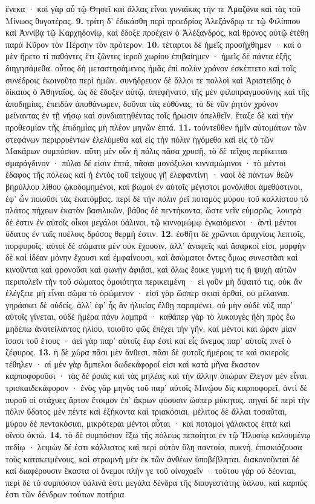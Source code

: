 \documentclass[a4paper, 11pt, oneside, polutonikogreek, german]{article}
\begin{document}
ἕνεκα · καὶ γὰρ αὖ τῷ Θησεῖ καὶ ἄλλας εἶναι γυναῖκας τήν τε Ἀμαζόνα καὶ τὰς τοῦ Μίνωος θυγατέρας. \textbf{9.} τρίτη δ' ἐδικάσθη περὶ προεδρίας Ἀλεξάνδρῳ τε τῷ Φιλίππου καὶ Ἀννίβᾳ τῷ Καρχηδονίῳ, καὶ ἔδοξε προέχειν ὁ Ἀλέξανδρος, καὶ θρόνος αὐτῷ ἐτέθη παρὰ Κῦρον τὸν Πέρσην τὸν πρότερον. \textbf{10.} τέταρτοι δὲ ἡμεῖς προσήχθημεν · καὶ ὁ μὲν ἤρετο τί παθόντες ἔτι ζῶντες ἱεροῦ χωρίου ἐπιβαίημεν · ἡμεῖς δὲ πάντα ἑξῆς διηγησάμεθα. οὗτος δὴ μεταστησάμενος ἡμᾶς ἐπὶ πολὺν χρόνον ἐσκέπτετο καὶ τοῖς συνέδροις ἐκοινοῦτο περὶ ἡμῶν. συνήδρευον δὲ ἄλλοι τε πολλοὶ καὶ Ἀριστείδης ὁ δίκαιος ὁ Ἀθηναῖος. ὡς δὲ ἔδοξεν αὐτῷ, ἀπεφήνατο, τῆς μὲν φιλοπραγμοσύνης καὶ τῆς ἀποδημίας, ἐπειδὰν ἀποθάνωμεν, δοῦναι τὰς εὐθύνας, τὸ δὲ νῦν ῥητὸν χρόνον μείναντας ἐν τῇ νήσῳ καὶ συνδιαιτηθέντας τοῖς ἥρωσιν ἀπελθεῖν. ἔταξε δὲ καὶ τὴν προθεσμίαν τῆς ἐπιδημίας μὴ πλέον μηνῶν ἑπτά. \textbf{11.} τοὐντεῦθεν ἡμῖν αὐτομάτων τῶν στεφάνων περιρρυέντων ἐλελύμεθα καὶ εἰς τὴν πόλιν ἡγόμεθα καὶ εἰς τὸ τῶν Μακάρων συμπόσιον. αὕτη μὲν οὖν ἡ πόλις πᾶσα χρυσῆ, τὸ δὲ τεῖχος περίκειται σμαράγδινον · πύλαι δέ εἰσιν ἑπτά, πᾶσαι μονόξυλοι κινναμώμινοι · τὸ μέντοι ἔδαφος τῆς πόλεως καὶ ἡ ἐντὸς τοῦ τείχους γῆ ἐλεφαντίνη · ναοὶ δὲ πάντων θεῶν βηρύλλου λίθου ᾠκοδομημένοι, καὶ βωμοὶ ἐν αὐτοῖς μέγιστοι μονόλιθοι ἀμεθύστινοι, ἐφ' ὧν ποιοῦσι τὰς ἑκατόμβας. περὶ δὲ τὴν πόλιν ῥεῖ ποταμὸς μύρου τοῦ καλλίστου τὸ πλάτος πήχεων ἑκατὸν βασιλικῶν, βάθος δὲ πεντήκοντα, ὥστε νεῖν εὐμαρῶς. λουτρὰ δέ ἐστιν ἐν αὐτοῖς οἶκοι μεγάλοι ὑάλινοι, τῷ κινναμώμῳ ἐγκαιόμενοι · ἀντὶ μέντοι ὕδατος ἐν ταῖς πυέλοις δρόσος θερμή ἐστιν. \textbf{12.} ἐσθῆτι δὲ χρῶνται ἀραχνίοις λεπτοῖς, πορφυροῖς. αὐτοὶ δὲ σώματα μὲν οὐκ ἔχουσιν, ἀλλ' ἀναφεῖς καὶ ἄσαρκοί εἰσι, μορφὴν δὲ καὶ ἰδέαν μόνην ἔχουσι καὶ ἐμφαίνουσι, καὶ ἀσώματοι ὄντες ὅμως συνεστᾶσι καὶ κινοῦνται καὶ φρονοῦσι καὶ φωνὴν ἀφιἄσι, καὶ ὅλως ἔοικε γυμνή τις ἡ ψυχὴ αὐτῶν περιπολεῖν τὴν τοῦ σώματος ὁμοιότητα περικειμένη · εἰ γοῦν μὴ ἅψαιτό τις, οὐκ ἂν ἐλέγξειε μὴ εἶναι σῶμα τὸ ὁρώμενον · εἰσὶ γὰρ ὥσπερ σκιαὶ ὀρθαί, οὐ μέλαιναι. γηράσκει δὲ οὐδείς, ἀλλ' ἐφ' ἧς ἂν ἡλικίας ἔλθῃ παραμένει. οὐ μὴν οὐδὲ νὺξ παρ' αὐτοῖς γίνεται, οὐδὲ ἡμέρα πάνυ λαμπρά · καθάπερ γὰρ τὸ λυκαυγὲς ἤδη πρὸς ἕω μηδέπω ἀνατείλαντος ἡλίου, τοιοῦτο φῶς ἐπέχει τὴν γῆν. καὶ μέντοι καὶ ὥραν μίαν ἴσασι τοῦ ἔτους · ἀεὶ γὰρ παρ' αὐτοῖς ἔαρ ἐστὶ καὶ εἷς ἄνεμος παρ' αὐτοῖς πνεῖ ὁ ζέφυρος. \textbf{13.} ἡ δὲ χώρα πᾶσι μὲν ἄνθεσι, πᾶσι δὲ φυτοῖς ἡμέροις τε καὶ σκιεροῖς τέθηλεν · αἱ μὲν γὰρ ἄμπελοι δωδεκάφοροί εἰσι καὶ κατὰ μῆνα ἕκαστον καρποφοροῦσι · τὰς δὲ ῥοιὰς καὶ τὰς μηλέας καὶ τὴν ἄλλην ὀπώραν ἔλεγον μὲν εἶναι τρισκαιδεκάφορον · ἑνὸς γὰρ μηνὸς τοῦ παρ' αὐτοῖς Μινῴου δὶς καρποφορεῖ. ἀντὶ δὲ πυροῦ οἱ στάχυες ἄρτον ἕτοιμον ἐπ' ἄκρων φύουσιν ὥσπερ μύκητας. πηγαὶ δὲ περὶ τὴν πόλιν ὕδατος μὲν πέντε καὶ ἑξήκοντα καὶ τριακόσιαι, μέλιτος δὲ ἄλλαι τοσαῦται, μύρου δὲ πεντακόσιαι, μικρότεραι μέντοι αὗται · καὶ ποταμοὶ γάλακτος ἑπτὰ καὶ οἴνου ὀκτώ. \textbf{14.} τὸ δὲ συμπόσιον ἔξω τῆς πόλεως πεποίηται ἐν τῷ Ἠλυσίῳ καλουμένῳ πεδίῳ · λειμὼν δέ ἐστι κάλλιστος καὶ περὶ αὐτὸν ὕλη παντοία, πυκνή, ἐπισκιάζουσα τοὺς κατακειμένους, καὶ στρωμνὴ μὲν ἐκ τῶν ἀνθέων ὑποβέβληται. διακονοῦνται δὲ καὶ διαφέρουσιν ἕκαστα οἱ ἄνεμοι πλήν γε τοῦ οἰνοχοεῖν · τούτου γὰρ οὐ δέονται, περὶ δὲ τὸ συμπόσιον ὑάλινά ἐστι μεγάλα δένδρα τῆς διαυγεστάτης ὑάλου, καὶ καρπός ἐστι τῶν δένδρων τούτων ποτήρια 
\end{document}
